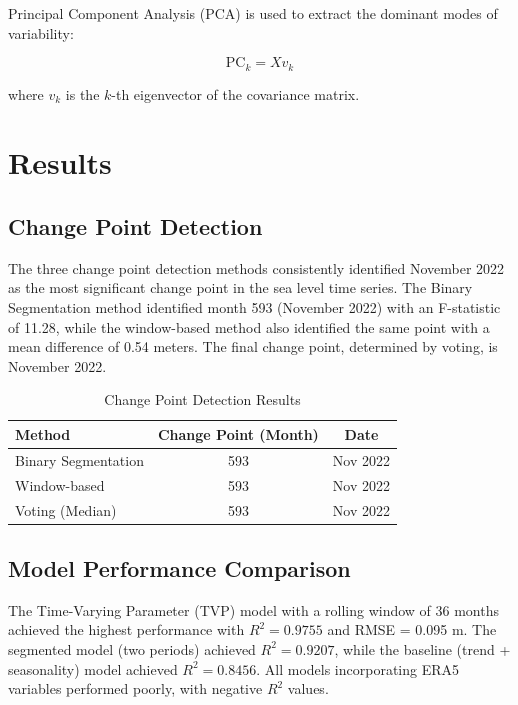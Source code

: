 \documentclass[12pt,a4paper,twocolumn]{article}
\begin{document}
Principal Component Analysis (PCA) is used to extract the dominant modes of variability:

\begin{equation}
\text{PC}_k = X v_k
\end{equation}

where $v_k$ is the $k$-th eigenvector of the covariance matrix.

\section{Results}

\subsection{Change Point Detection}

The three change point detection methods consistently identified November 2022 as the most significant change point in the sea level time series. The Binary Segmentation method identified month 593 (November 2022) with an F-statistic of 11.28, while the window-based method also identified the same point with a mean difference of 0.54 meters. The final change point, determined by voting, is November 2022.

\begin{table}[H]
\centering
\caption{Change Point Detection Results}
\label{tab:change_point}
\begin{tabular}{lcc}
\toprule
Method & Change Point (Month) & Date \\
\midrule
Binary Segmentation & 593 & Nov 2022 \\
Window-based & 593 & Nov 2022 \\
Voting (Median) & 593 & Nov 2022 \\
\bottomrule
\end{tabular}
\end{table}

\subsection{Model Performance Comparison}

The Time-Varying Parameter (TVP) model with a rolling window of 36 months achieved the highest performance with $R^2 = 0.9755$ and RMSE = 0.095 m. The segmented model (two periods) achieved $R^2 = 0.9207$, while the baseline (trend + seasonality) model achieved $R^2 = 0.8456$. All models incorporating ERA5 variables performed poorly, with negative $R^2$ values.
\end{document}
